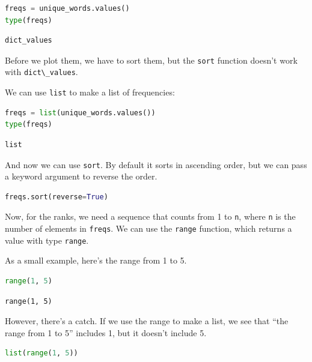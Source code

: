 \begin{lstlisting}[language=Python]
freqs = unique_words.values()
type(freqs)
\end{lstlisting}

\begin{lstlisting}[]
dict_values
\end{lstlisting}

Before we plot them, we have to sort them, but the
\passthrough{\lstinline!sort!} function doesn't work with
\passthrough{\lstinline!dict\_values!}.

We can use \passthrough{\lstinline!list!} to make a list of frequencies:

\begin{lstlisting}[language=Python]
freqs = list(unique_words.values())
type(freqs)
\end{lstlisting}

\begin{lstlisting}[]
list
\end{lstlisting}

And now we can use \passthrough{\lstinline!sort!}. By default it sorts
in ascending order, but we can pass a keyword argument to reverse the
order.

\begin{lstlisting}[language=Python]
freqs.sort(reverse=True)
\end{lstlisting}

Now, for the ranks, we need a sequence that counts from 1 to
\passthrough{\lstinline!n!}, where \passthrough{\lstinline!n!} is the
number of elements in \passthrough{\lstinline!freqs!}. We can use the
\passthrough{\lstinline!range!} function, which returns a value with
type \passthrough{\lstinline!range!}.

As a small example, here's the range from 1 to 5.

\begin{lstlisting}[language=Python]
range(1, 5)
\end{lstlisting}

\begin{lstlisting}[]
range(1, 5)
\end{lstlisting}

However, there's a catch. If we use the range to make a list, we see
that ``the range from 1 to 5'' includes 1, but it doesn't include 5.

\begin{lstlisting}[language=Python]
list(range(1, 5))
\end{lstlisting}

